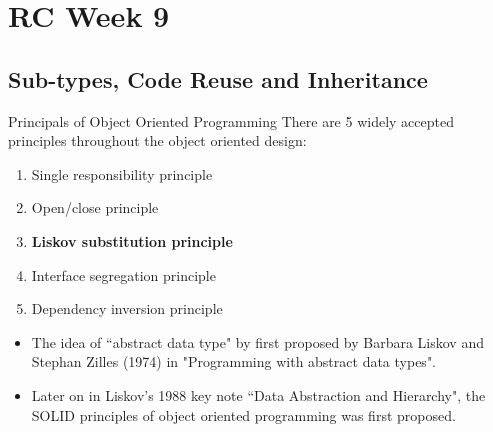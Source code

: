 \section{RC Week 9}
\subsection{Sub-types, Code Reuse and Inheritance}
\begin{frame}{Principals of Object Oriented Programming}
There are 5 widely accepted principles throughout the object oriented design:
\begin{enumerate}
	\item \alert{S}ingle responsibility principle
	\item \alert{O}pen/close principle
	\item \textbf{\alert{L}iskov substitution principle}
	\item \alert{I}nterface segregation principle
	\item \alert{D}ependency inversion principle
\end{enumerate}
\begin{itemize}
	\item The idea of ``abstract data type" by first proposed by Barbara Liskov and Stephan Zilles (1974) in  "Programming with abstract data types".
	\item Later on in Liskov's 1988 key note ``Data Abstraction and Hierarchy", the SOLID principles of object oriented programming was first proposed. 
\end{itemize}
\end{frame}
